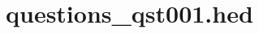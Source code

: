 
\section{questions\_qst001.hed} \label{apendiceQuestions}

\agregar
\begin{lstlisting}


\end{lstlisting}
